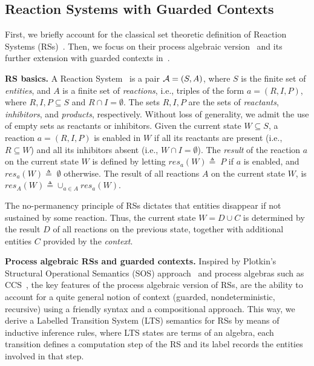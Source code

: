 
\subsection{Reaction Systems with Guarded Contexts}

First, we briefly account for the classical set theoretic definition of Reaction Systems (RSs)~\cite{DBLP:journals/fuin/EhrenfeuchtR07}. Then, we focus on their process algebraic version~\cite{DBLP:journals/tcs/BrodoBF21} and its further extension with guarded contexts in~\cite{DBLP:conf/cmsb/BowlesBBFGM24}.


\medskip
\noindent
\textbf{RS basics.}
A Reaction System~\cite{DBLP:journals/fuin/EhrenfeuchtR07} is a pair ${\cal A} = (S, A)$, where $S$ is the finite set of \emph{entities}, and $A$ is a finite set of \emph{reactions}, i.e., triples of the form $a = (R,I,P)$, where $R, I, P\subseteq S$ and $R \cap I = \emptyset$. 
The sets $R, I, P$ are the sets of \emph{reactants}, \emph{inhibitors}, and  \emph{products}, respectively. 
Without loss of generality, we admit the use of empty sets as reactants or inhibitors.
%
Given the current state $W\subseteq S$, a reaction $a = (R,I,P)$ is enabled in $W$ if all its reactants are present (i.e., $R\subseteq W$) and all its inhibitors absent (i.e., $W \cap I = \emptyset$).
The \emph{result} of the reaction $a$ on the current state $W$ is defined by letting
$
\mathit{res}_a(W) \triangleq\;
P$ if $a$ is enabled, and
$\mathit{res}_a(W) \triangleq\; \emptyset$ otherwise.
The result of all reactions $A$ on the current state $W$, is $\mathit{res}_A(W) \triangleq \cup_{a \in A} \mathit{res}_a(W)$.

The no-permanency principle of RSs dictates that entities disappear if not sustained by some reaction.
Thus, the current state $W=D\cup C$ is determined by the result $D$ of all reactions on the previous state, together with additional entities $C$ provided by the \emph{context}. 

\medskip
\noindent
\textbf{Process algebraic RSs and guarded contexts.}
Inspired by Plotkin's Structural Operational Semantics (SOS) approach~\cite{DBLP:journals/jlp/Plotkin04a} and process algebras such as CCS~\cite{Milner80}, the key features of the process algebraic version of RSs, are the ability to account for a quite general notion of context (guarded, nondeterministic, recursive) using a friendly syntax and a compositional approach. This way, we derive a Labelled Transition System (LTS) semantics for RSs by means of inductive inference rules, where LTS states are terms of an algebra, each transition defines a computation step of the RS and its label records the entities involved in that step.

